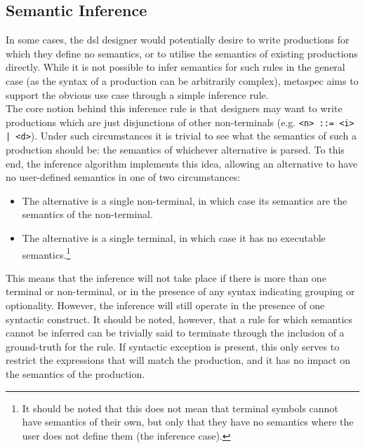 \subsection{Semantic Inference} %
\label{sub:semantic_inference}
In some cases, the \gls{dsl} designer would potentially desire to write productions for which they define no semantics, or to utilise the semantics of existing productions directly.
While it is not possible to infer semantics for such rules in the general case (as the syntax of a production can be arbitrarily complex), \gls{metaspec} aims to support the obvious use case through a simple inference rule. \\

The core notion behind this inference rule is that designers may want to write productions which are just disjunctions of other non-terminals (e.g. \texttt{<n> ::= <i> | <d>}).
Under such circumstances it is trivial to see what the semantics of such a production should be: the semantics of whichever alternative is parsed. 
To this end, the inference algorithm implements this idea, allowing an alternative to have no user-defined semantics in one of two circumstances:
\begin{itemize}
    \item The alternative is a single non-terminal, in which case its semantics are the semantics of the non-terminal.
    \item The alternative is a single terminal, in which case it has no executable semantics.\footnote{It should be noted that this does not mean that terminal symbols cannot have semantics of their own, but only that they have no semantics where the user does not define them (the inference case).}  
\end{itemize}

This means that the inference will not take place if there is more than one terminal or non-terminal, or in the presence of any syntax indicating grouping or optionality. 
However, the inference will still operate in the presence of one syntactic construct.
It should be noted, however, that a rule for which semantics cannot be inferred can be trivially said to terminate through the inclusion of a ground-truth for the rule. 
If syntactic exception is present, this only serves to restrict the expressions that will match the production, and it has no impact on the semantics of the production.\\


